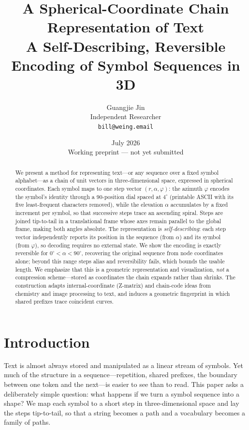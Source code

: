 \documentclass[11pt]{article}
\title{A Spherical-Coordinate Chain Representation of Text\\[2pt]
\large A Self-Describing, Reversible Encoding of Symbol Sequences in 3D}
\author{Guangjie Jin \\ Independent Researcher \\ \texttt{bill@weing.email}}
\date{July 2026 \\[4pt] \small Working preprint --- not yet submitted}
\renewcommand{\deg}{^{\circ}}  %
\begin{document}
\maketitle

\begin{abstract}
We present a method for representing text---or any sequence over a fixed symbol
alphabet---as a chain of unit vectors in three-dimensional space, expressed in spherical
coordinates. Each symbol maps to one step vector $(r,\alpha,\varphi)$: the azimuth
$\varphi$ encodes the symbol's identity through a $90$-position dial spaced at $4\deg$
(printable ASCII with its five least-frequent characters removed), while the elevation
$\alpha$ accumulates by a fixed increment per symbol, so that successive steps trace an
ascending spiral. Steps are joined tip-to-tail in a translational frame whose axes remain
parallel to the global frame, making both angles absolute. The representation is
\emph{self-describing}: each step vector independently reports its position in the sequence
(from $\alpha$) and its symbol (from $\varphi$), so decoding requires no external state. We
show the encoding is exactly reversible for $0\deg<\alpha<90\deg$, recovering the original
sequence from node coordinates alone; beyond this range steps alias and reversibility
fails, which bounds the usable length. We emphasize that this is a geometric representation
and visualization, \emph{not} a compression scheme---stored as coordinates the chain
expands rather than shrinks. The construction adapts internal-coordinate (Z-matrix) and
chain-code ideas from chemistry and image processing to text, and induces a geometric
fingerprint in which shared prefixes trace coincident curves.
\end{abstract}

\section{Introduction}

Text is almost always stored and manipulated as a linear stream of symbols. Yet much of the
structure in a sequence---repetition, shared prefixes, the boundary between one token and
the next---is easier to see than to read. This paper asks a deliberately simple question:
what happens if we turn a symbol sequence into a shape? We map each symbol to a short step
in three-dimensional space and lay the steps tip-to-tail, so that a string becomes a path
and a vocabulary becomes a family of paths.
\end{document}
